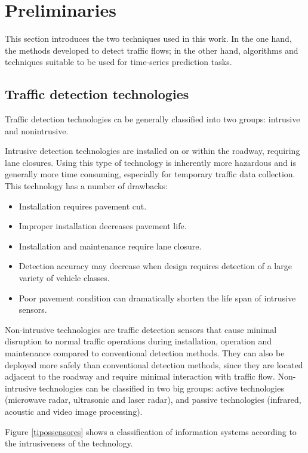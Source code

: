 \documentclass[preprint,authoryear,12pt]{elsarticle}
\begin{document}
\section{Preliminaries}
\label{sec:soa}
This section introduces the two techniques used in this work. In the one hand, the methods developed to detect traffic flows; in the other hand, algorithms and techniques suitable to be used for time-series prediction tasks.

\subsection{Traffic detection technologies}
\label{subsec:traffic}

Traffic detection technologies ca be generally classified into two groups: intrusive and nonintrusive.

Intrusive detection technologies are installed on or within the roadway, requiring lane closures. Using this type of technology is inherently more hazardous and is generally more time consuming, especially for temporary traffic data collection. This technology has a number of drawbacks:
\begin{itemize}
  \item Installation requires pavement cut.
  \item Improper installation decreases pavement life.
  \item Installation and maintenance require lane closure.
  \item Detection accuracy may decrease when design requires detection of a large variety of vehicle classes.
  \item Poor pavement condition can dramatically shorten the life span of intrusive sensors.
\end{itemize}

Non-intrusive technologies are traffic detection sensors that cause minimal disruption to normal traffic operations during installation, operation and maintenance compared to conventional detection methods. They can also be deployed more safely than conventional detection methods, since they are located adjacent to the roadway and require minimal interaction with traffic flow. Non-intrusive technologies can be classified in two big groups: active technologies (microwave radar, ultrasonic and laser radar), and passive technologies (infrared, acoustic and video image processing). 

Figure \ref{tipossensores} shows a classification of information systems according to the intrusiveness of the technology.
\end{document}
